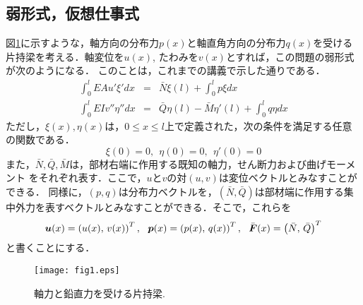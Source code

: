 ﻿\documentclass[10pt,a4j]{jarticle}
\begin{document}
\subsection{弱形式，仮想仕事式}
図\ref{fig:fig1}に示すような，軸方向の分布力$p(x)$と軸直角方向の分布力$q(x)$を受ける片持梁を考える．軸変位を$u(x)$, たわみを$v(x)$とすれば，この問題の弱形式が次のようになる．
このことは，これまでの講義で示した通りである．
\begin{eqnarray}
	\int_0^l EAu'\xi'dx &= & 
	\bar N \xi(l)+\int_0^l p\xi dx 
	\label{eqn:WF_N}
	\\
	\int_0^l EIv''\eta''dx &= & 
	\bar Q \eta(l)-\bar M\eta'(l) +\int_0^l q\eta dx 
	\label{eqn:WF_M}
\end{eqnarray}
ただし，$\xi(x),\eta(x)$は，$0\leq x \leq l$上で定義された，次の条件を満足する任意の関数である．
\begin{equation}
	\xi(0)=0, \ \ \eta(0)=0, \ \ \eta'(0)=0
	\label{eqn:}
\end{equation}
また，$\bar{N},\bar{Q},\bar{M}$は，部材右端に作用する既知の軸力，せん断力および曲げモーメント
をそれぞれ表す．ここで，$u$と$v$の対$(u,v)$は変位ベクトルとみなすことができる．
同様に，$(p,q)$は分布力ベクトルを，$(\bar{N},\bar{Q})$は部材端に作用する集中外力を表すベクトルとみなすことができる．そこで，これらを
\begin{equation}
	\fat{u}(x)=\left(u(x),\, v(x) \right)^T
	, \ \ 
	\fat{p}(x)=\left(p(x),\, q(x) \right)^T
	, \ \ 
	\bar{\fat{F}}(x)=\left(\bar{N},\, \bar{Q} \right)^T
	\label{eqn:def_vecs}
\end{equation}
と書くことにする．
\begin{figure}[h]
	\begin{center}
	\texttt{[image: fig1.eps]} 
	\end{center}
	\caption{軸力と鉛直力を受ける片持梁.} 
	\label{fig:fig1}
\end{figure}
\end{document}
